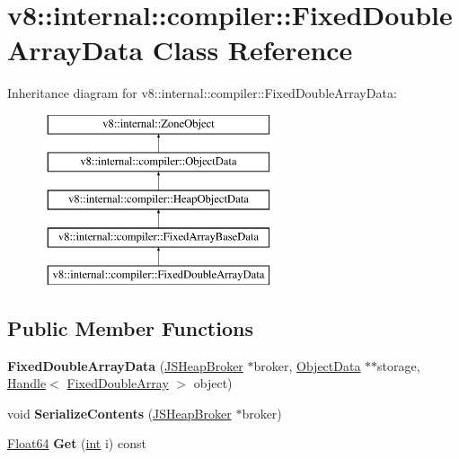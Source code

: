 \hypertarget{classv8_1_1internal_1_1compiler_1_1FixedDoubleArrayData}{}\section{v8\+:\+:internal\+:\+:compiler\+:\+:Fixed\+Double\+Array\+Data Class Reference}
\label{classv8_1_1internal_1_1compiler_1_1FixedDoubleArrayData}
Inheritance diagram for v8\+:\+:internal\+:\+:compiler\+:\+:Fixed\+Double\+Array\+Data\+:\begin{figure}[H]
\begin{center}
\leavevmode
\includegraphics[height=5.000000cm]{classv8_1_1internal_1_1compiler_1_1FixedDoubleArrayData}
\end{center}
\end{figure}
\subsection*{Public Member Functions}
\begin{DoxyCompactItemize}
\item 
\mbox{\label{classv8_1_1internal_1_1compiler_1_1FixedDoubleArrayData_a2109c719de7f8758cdc321d93e836d07}} 
{\bfseries Fixed\+Double\+Array\+Data} (\mbox{\hyperlink{classv8_1_1internal_1_1compiler_1_1JSHeapBroker}{J\+S\+Heap\+Broker}} $\ast$broker, \mbox{\hyperlink{classv8_1_1internal_1_1compiler_1_1ObjectData}{Object\+Data}} $\ast$$\ast$storage, \mbox{\hyperlink{classv8_1_1internal_1_1Handle}{Handle}}$<$ \mbox{\hyperlink{classv8_1_1internal_1_1FixedDoubleArray}{Fixed\+Double\+Array}} $>$ object)
\item 
\mbox{\label{classv8_1_1internal_1_1compiler_1_1FixedDoubleArrayData_a3738b500d1bc90b064219f5e5520525d}} 
void {\bfseries Serialize\+Contents} (\mbox{\hyperlink{classv8_1_1internal_1_1compiler_1_1JSHeapBroker}{J\+S\+Heap\+Broker}} $\ast$broker)
\item 
\mbox{\label{classv8_1_1internal_1_1compiler_1_1FixedDoubleArrayData_a2b0db71268063f76aa0506995172efc2}} 
\mbox{\hyperlink{classv8_1_1internal_1_1Float64}{Float64}} {\bfseries Get} (\mbox{\hyperlink{classint}{int}} i) const
\end{DoxyCompactItemize}
